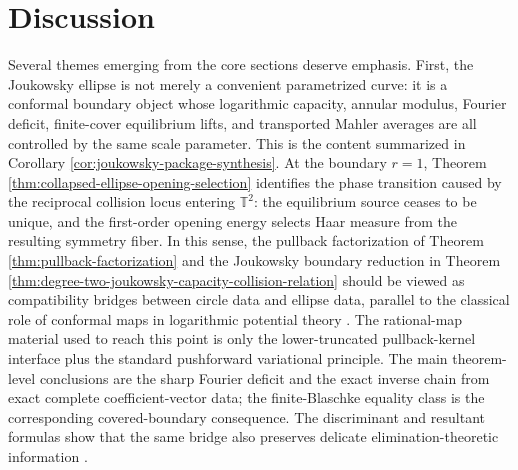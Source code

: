 \documentclass[12pt,a4paper]{article}
\theoremstyle{plain}
\theoremstyle{definition}
\numberwithin{equation}{section}
\newcommand{\TT}{\mathbb{T}}
\begin{document}
\section{Discussion}\label{sec:discussion}
Several themes emerging from the core sections deserve emphasis. First, the Joukowsky ellipse is not merely a convenient parametrized curve: it is a conformal boundary object whose logarithmic capacity, annular modulus, Fourier deficit, finite-cover equilibrium lifts, and transported Mahler averages are all controlled by the same scale parameter.  This is the content summarized in Corollary \ref{cor:joukowsky-package-synthesis}.  At the boundary \(r=1\), Theorem \ref{thm:collapsed-ellipse-opening-selection} identifies the phase transition caused by the reciprocal collision locus entering \(\TT^2\): the equilibrium source ceases to be unique, and the first-order opening energy selects Haar measure from the resulting symmetry fiber.  In this sense, the pullback factorization of Theorem \ref{thm:pullback-factorization} and the Joukowsky boundary reduction in Theorem \ref{thm:degree-two-joukowsky-capacity-collision-relation} should be viewed as compatibility bridges between circle data and ellipse data, parallel to the classical role of conformal maps in logarithmic potential theory \citep{Tsuji1959,Ransford1995,Pommerenke1992}. The rational-map material used to reach this point is only the lower-truncated pullback-kernel interface plus the standard pushforward variational principle. The main theorem-level conclusions are the sharp Fourier deficit and the exact inverse chain from exact complete coefficient-vector data; the finite-Blaschke equality class is the corresponding covered-boundary consequence. The discriminant and resultant formulas show that the same bridge also preserves delicate elimination-theoretic information \citep{GKZ1994}.
\end{document}
